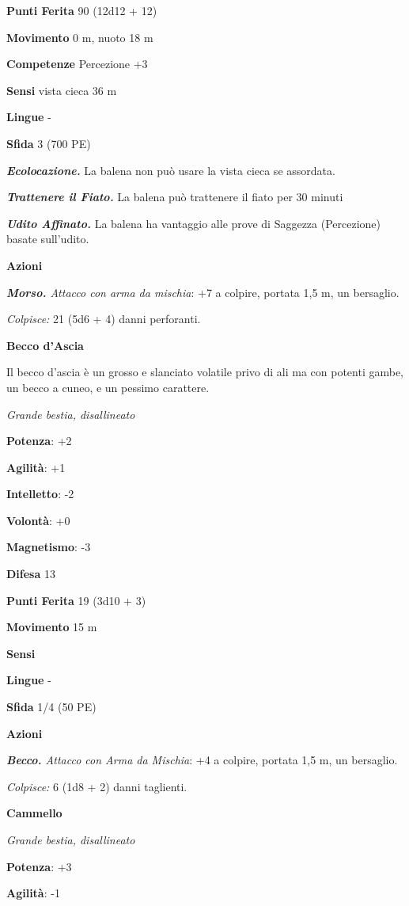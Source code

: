 \begin{multicols}{2}
\textbf{Punti Ferita} 90 (12d12 + 12)

\textbf{Movimento} 0 m, nuoto 18 m

\textbf{Competenze} Percezione +3

\textbf{Sensi} vista cieca 36 m

\textbf{Lingue} -

\textbf{Sfida} 3 (700 PE)

\emph{\textbf{Ecolocazione.}} La balena non può usare la vista cieca se
assordata.

\emph{\textbf{Trattenere il Fiato.}} La balena può trattenere il fiato
per 30 minuti

\emph{\textbf{Udito Affinato.}} La balena ha vantaggio alle prove di
Saggezza (Percezione) basate sull'udito.

\textbf{Azioni}

\emph{\textbf{Morso.} Attacco con arma da mischia}: +7 a colpire,
portata 1,5 m, un bersaglio.

\emph{Colpisce:} 21 (5d6 + 4) danni perforanti.

\textbf{Becco d'Ascia}

Il becco d'ascia è un grosso e slanciato volatile privo di ali ma con
potenti gambe, un becco a cuneo, e un pessimo carattere.

\emph{Grande bestia, disallineato}

\textbf{Potenza}: +2

\textbf{Agilità}: +1

\textbf{Intelletto}: -2

\textbf{Volontà}: +0

\textbf{Magnetismo}: -3

\textbf{Difesa} 13

\textbf{Punti Ferita} 19 (3d10 + 3)

\textbf{Movimento} 15 m

\textbf{Sensi} 

\textbf{Lingue} -

\textbf{Sfida} 1/4 (50 PE)

\textbf{Azioni}

\emph{\textbf{Becco.} Attacco con Arma da Mischia}: +4 a colpire,
portata 1,5 m, un bersaglio.

\emph{Colpisce:} 6 (1d8 + 2) danni taglienti.

\textbf{Cammello}

\emph{Grande bestia, disallineato}

\textbf{Potenza}: +3

\textbf{Agilità}: -1


\end{multicols}

